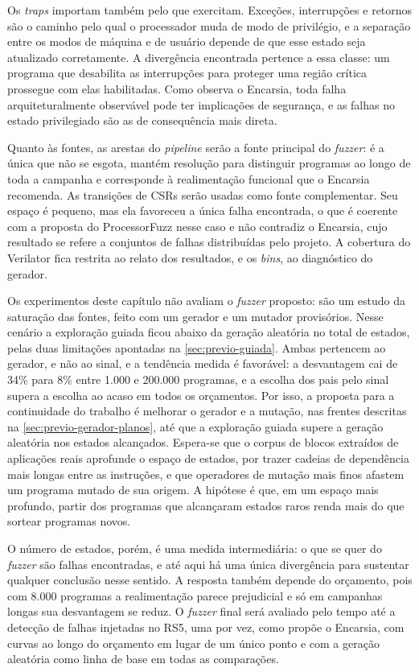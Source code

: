 Os \textit{traps} importam também pelo que exercitam. Exceções, interrupções e retornos são o caminho pelo qual o processador muda de modo de privilégio, e a separação entre os modos de máquina e de usuário depende de que esse estado seja atualizado corretamente. A divergência encontrada pertence a essa classe: um programa que desabilita as interrupções para proteger uma região crítica prossegue com elas habilitadas. Como observa o Encarsia, toda falha arquiteturalmente observável pode ter implicações de segurança, e as falhas no estado privilegiado são as de consequência mais direta.

Quanto às fontes, as arestas do \textit{pipeline} serão a fonte principal do \textit{fuzzer}: é a única que não se esgota, mantém resolução para distinguir programas ao longo de toda a campanha e corresponde à realimentação funcional que o Encarsia recomenda. As transições de CSRs serão usadas como fonte complementar. Seu espaço é pequeno, mas ela favoreceu a única falha encontrada, o que é coerente com a proposta do ProcessorFuzz nesse caso e não contradiz o Encarsia, cujo resultado se refere a conjuntos de falhas distribuídas pelo projeto. A cobertura do Verilator fica restrita ao relato dos resultados, e os \textit{bins}, ao diagnóstico do gerador.

Os experimentos deste capítulo não avaliam o \textit{fuzzer} proposto: são um estudo da saturação das fontes, feito com um gerador e um mutador provisórios. Nesse cenário a exploração guiada ficou abaixo da geração aleatória no total de estados, pelas duas limitações apontadas na \cref{sec:previo-guiada}. Ambas pertencem ao gerador, e não ao sinal, e a tendência medida é favorável: a desvantagem cai de 34\% para 8\% entre 1.000 e 200.000 programas, e a escolha dos pais pelo sinal supera a escolha ao acaso em todos os orçamentos. Por isso, a proposta para a continuidade do trabalho é melhorar o gerador e a mutação, nas frentes descritas na \cref{sec:previo-gerador-planos}, até que a exploração guiada supere a geração aleatória nos estados alcançados. Espera-se que o corpus de blocos extraídos de aplicações reais aprofunde o espaço de estados, por trazer cadeias de dependência mais longas entre as instruções, e que operadores de mutação mais finos afastem um programa mutado de sua origem. A hipótese é que, em um espaço mais profundo, partir dos programas que alcançaram estados raros renda mais do que sortear programas novos.

O número de estados, porém, é uma medida intermediária: o que se quer do \textit{fuzzer} são falhas encontradas, e até aqui há uma única divergência para sustentar qualquer conclusão nesse sentido. A resposta também depende do orçamento, pois com 8.000 programas a realimentação parece prejudicial e só em campanhas longas sua desvantagem se reduz. O \textit{fuzzer} final será avaliado pelo tempo até a detecção de falhas injetadas no RS5, uma por vez, como propõe o Encarsia, com curvas ao longo do orçamento em lugar de um único ponto e com a geração aleatória como linha de base em todas as comparações.

